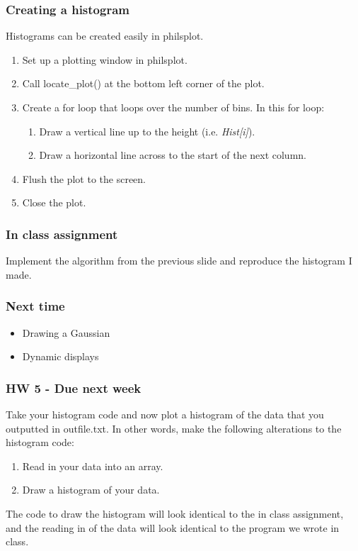 \documentclass{beamer}
\begin{document}
\begin{frame}
  \frametitle{Creating a histogram}
  Histograms can be created easily in philsplot.
  \begin{enumerate}
  \item Set up a plotting window in philsplot.
  \item Call locate\_plot() at the bottom left corner of the plot.
  \item Create a for loop that loops over the number of bins. In this
    for loop:\\
    \begin{enumerate}
    \item Draw a vertical line up to the height (i.e. \textit{Hist[i]}).
    \item Draw a horizontal line across to the start of the next column.
    \end{enumerate}
  \item Flush the plot to the screen.
  \item Close the plot.
  \end{enumerate}
\end{frame}

\begin{frame}
  \frametitle{In class assignment}
  Implement the algorithm from the previous slide and reproduce the
  histogram I made.
\end{frame}

\begin{frame}
  \frametitle{Next time}
  \begin{itemize}
    \item Drawing a Gaussian
    \item Dynamic displays
  \end{itemize}
\end{frame}

\begin{frame}
  \frametitle{HW 5 - Due next week}
  Take your histogram code and now plot a histogram of the data 
  that you outputted in outfile.txt. In other words, 
  make the following alterations to the histogram code:
  \begin{enumerate}
    \item Read in your data into an array.
    \item Draw a histogram of your data.
  \end{enumerate}
  The code to draw the histogram will look identical to the in class
  assignment, and the reading in of the data will look identical
  to the program we wrote in class.
\end{frame}
\end{document}
